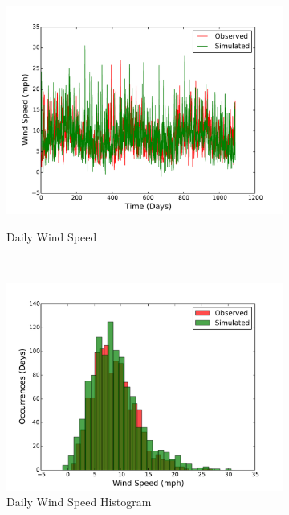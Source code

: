 \documentclass[11pt, letterpaper]{article}
\begin{document}
\begin{figure}[H]
  \centering
  \begin{subfigure}[b]{0.45\textwidth}
    \includegraphics[width=\textwidth]{figures/daily_wind_speeds.pdf}
    \label{fig:analysis-raw}
    \caption{Daily Wind Speed}
  \end{subfigure}
  ~
  \begin{subfigure}[b]{0.45\textwidth}
    \includegraphics[width=\textwidth]{figures/daily_wind_speed_hist.pdf}
    \caption{Daily Wind Speed Histogram}
  \end{subfigure}
  ~
  \begin{subfigure}[b]{0.45\textwidth}

\end{subfigure}
\end{figure}
\end{document}
